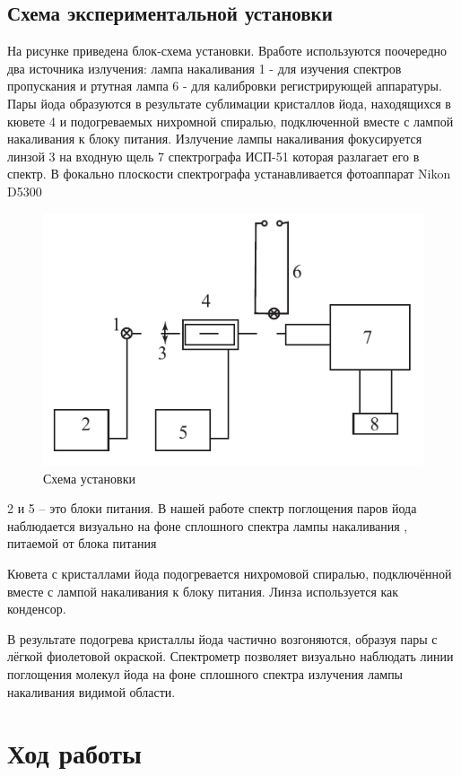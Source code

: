 \documentclass[a4paper, 12pt]{article}
\begin{document}
\subsection{Схема экспериментальной установки}
        На рисунке приведена блок-схема установки. Вработе используются поочередно два источника излучения: лампа накаливания 1 - для изучения спектров пропускания и ртутная лампа 6 - для калибровки регистрирующей аппаратуры. Пары йода образуются в результате сублимации кристаллов йода, находящихся в кювете 4 и подогреваемых нихромной спиралью, подключенной вместе с лампой накаливания к блоку питания. Излучение лампы накаливания фокусируется линзой 3 на входную щель 7 спектрографа ИСП-51 которая разлагает его в спектр. В фокально плоскости спектрографа устанавливается фотоаппарат Nikon D5300
\begin{figure}[!htb]
	\centering
	\includegraphics[scale=1]{experiment.pdf}
	\caption{Схема установки}
\end{figure}

        2 и 5 -- это блоки питания. В нашей работе спектр поглощения паров йода наблюдается визуально на фоне сплошного спектра лампы накаливания , питаемой от блока питания 
	    
	    Кювета с кристаллами йода подогревается нихромовой спиралью, подключённой вместе с лампой накаливания к блоку питания. Линза используется как конденсор.
	    
	    В результате подогрева кристаллы йода частично возгоняются, образуя пары с лёгкой фиолетовой окраской. Спектрометр позволяет визуально наблюдать линии поглощения молекул йода на фоне сплошного спектра излучения лампы накаливания видимой области.
\section{Ход работы}
\end{document}
